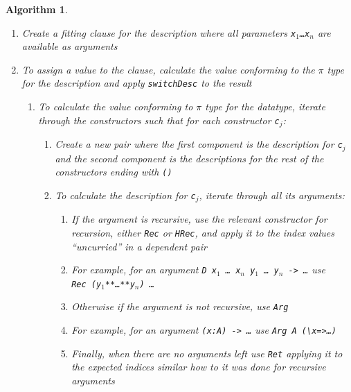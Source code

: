 \documentclass{ituthesis}
\newcommand{\ttconstructor}[1]{\textcolor{constructor-color}{\texttt{#1}}}
\newcommand{\tttype}[1]{\textcolor{type-color}{\texttt{#1}}}
\newcommand{\ttdec}[1]{\textcolor{declared-var-color}{\texttt{#1}}}
\newcommand{\ttvar}[1]{\textcolor{local-var-color}{\texttt{#1}}}
\theoremstyle{break}
\newtheorem{alg}{Algorithm}
\begin{document}
\begin{alg}
\begin{enumerate}
\begin{enumerate}
           \texttt{->~}\ttdec{TaggedDesc}~\texttt{(\textbf{labels\_for}}~\tttype{D}\texttt{)}~\tttype{(}\ttvar{y$_1$}\texttt{:}\ttvar{i$_1$}\tttype{**}\texttt{\ldots}\tttype{**}\ttvar{y$_n$}\texttt{:}\ttvar{i$_n$}\tttype{)} where \ttvar{a$_j$} is the type of a parameter and \ttvar{i$_k$} is the type of an index
       \end{enumerate}
     \item Create a fitting clause for the description where all parameters \ttvar{x$_1$}\texttt{\ldots}\ttvar{x$_n$} are available as arguments
     \item To assign a value to the clause, calculate the value conforming to the $\pi$ type for the description and apply \ttdec{switchDesc} to the result
       \begin{enumerate}
         \item To calculate the value conforming to $\pi$ type for the datatype, iterate through the constructors such that for each constructor \ttvar{c$_j$}:
         \begin{enumerate}
           \item Create a new pair where the first component is the description for \ttvar{c$_j$} and the second component is the descriptions for the rest of the constructors ending with \ttconstructor{()}
           \item To calculate the description for \ttvar{c$_j$}, iterate through all its arguments:
           \begin{enumerate}
             \item If the argument is recursive, use the relevant constructor for recursion, either \ttconstructor{Rec} or \ttconstructor{HRec}, and apply it to the index values ``uncurried'' in a dependent pair
             \item[] For example, for an argument \tttype{D}~\ttvar{x$_1$}~\texttt{\ldots}~\ttvar{x$_n$}~\ttvar{y$_1$}~\texttt{\ldots}~\ttvar{y$_n$}\texttt{~->~\ldots} use \ttconstructor{Rec}~\ttconstructor{(}\ttvar{y$_1$}\ttconstructor{**}\texttt{\ldots}\ttconstructor{**}\ttvar{y$_n$}\ttconstructor{)}~\texttt{\ldots}
             \item Otherwise if the argument is not recursive, use \ttconstructor{Arg}
             \item[] For example, for an argument \texttt{(}\ttvar{x}\texttt{:}\tttype{A}\texttt{)}\texttt{~->~\ldots} use \ttconstructor{Arg}~\tttype{A}~\texttt{(\textbackslash}\ttvar{x}\texttt{=>\ldots)}
             \item Finally, when there are no arguments left use \ttconstructor{Ret} applying it to the expected indices similar how to it was done for recursive arguments
           \end{enumerate}
         \end{enumerate}
       \end{enumerate}
  \end{enumerate}
  \label{alg:gendescd}
\end{alg}
\end{document}
